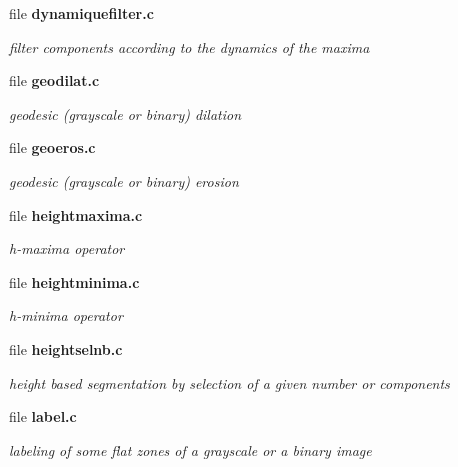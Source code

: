 \begin{CompactItemize}
\item 
file {\bf dynamiquefilter.c}
\begin{CompactList}\small\item\em filter components according to the dynamics of the maxima \item\end{CompactList}

\item 
file {\bf geodilat.c}
\begin{CompactList}\small\item\em geodesic (grayscale or binary) dilation \item\end{CompactList}

\item 
file {\bf geoeros.c}
\begin{CompactList}\small\item\em geodesic (grayscale or binary) erosion \item\end{CompactList}

\item 
file {\bf heightmaxima.c}
\begin{CompactList}\small\item\em h-maxima operator \item\end{CompactList}

\item 
file {\bf heightminima.c}
\begin{CompactList}\small\item\em h-minima operator \item\end{CompactList}

\item 
file {\bf heightselnb.c}
\begin{CompactList}\small\item\em height based segmentation by selection of a given number or components \item\end{CompactList}

\item 
file {\bf label.c}
\begin{CompactList}\small\item\em labeling of some flat zones of a grayscale or a binary image \item\end{CompactList}


\end{CompactItemize}
